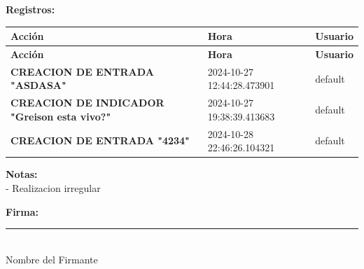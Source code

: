 \documentclass[a4paper,10pt]{article}
\begin{document}
\vspace{1.5em}

\noindent \textbf{Registros:} \\
\begin{longtable}{|p{}|p{}|p{}|}
    \hline
    \textbf{Acción} & \textbf{Hora} & \textbf{Usuario} \\
    \hline
    \endfirsthead
    \hline
    \textbf{Acción} & \textbf{Hora} & \textbf{Usuario} \\
    \hline
    \endhead
    \hline
    \endfoot
\textbf{CREACION DE ENTRADA "ASDASA"} & 2024-10-27 12:44:28.473901 & default \\ 
\textbf{CREACION DE INDICADOR "Greison esta vivo?"} & 2024-10-27 19:38:39.413683 & default \\ 
\textbf{CREACION DE ENTRADA "4234"} & 2024-10-28 22:46:26.104321 & default \\ 

\end{longtable}

\vspace{1.5em}

\noindent \textbf{Notas:} \\ - Realizacion irregular \\

\vspace{4em}

\noindent \textbf{Firma:} \\
\rule{5cm}{0.4pt} \\ %
Nombre del Firmante \\
\end{document}
